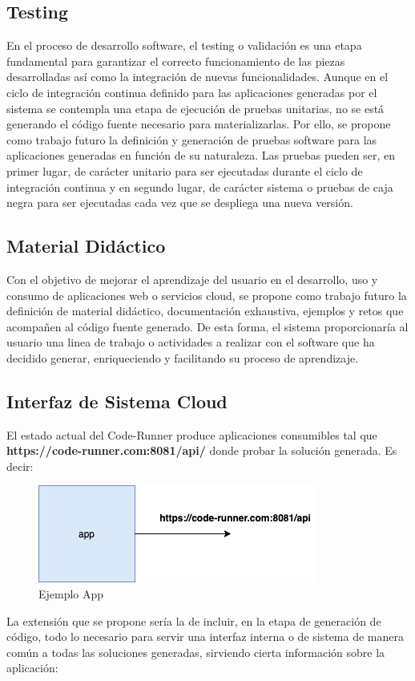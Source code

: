 \documentclass[a4paper,11pt]{book}
\begin{document}
\subsection{Testing}

 En el proceso de desarrollo software, el testing o validación es una etapa fundamental para garantizar el correcto funcionamiento de las piezas desarrolladas así como la integración de nuevas funcionalidades. Aunque en el ciclo de integración continua definido para las aplicaciones generadas por el sistema se contempla una etapa de ejecución de pruebas unitarias, no se está generando el código fuente necesario para materializarlas. Por ello, se propone como trabajo futuro la definición y generación de pruebas software para las aplicaciones generadas en función de su naturaleza. Las pruebas pueden ser, en primer lugar, de carácter unitario para ser ejecutadas durante el ciclo de integración continua y en segundo lugar, de carácter sistema o pruebas de caja negra para ser ejecutadas cada vez que se despliega una nueva versión. 

\subsection{Material Didáctico}

Con el objetivo de mejorar el aprendizaje del usuario en el desarrollo, uso y consumo de aplicaciones web o servicios cloud, se propone como trabajo futuro la definición de material didáctico, documentación exhaustiva, ejemplos y retos que acompañen al código fuente generado. De esta forma, el sistema proporcionaría al usuario una linea de trabajo o actividades a realizar con el software que ha decidido generar, enriqueciendo y facilitando su proceso de aprendizaje. 

\subsection{Interfaz de Sistema Cloud}


El estado actual del Code-Runner produce aplicaciones consumibles tal que  \textbf{ https://code-runner.com:8081/api/}  donde probar la solución generada. Es decir: 

   \begin{figure}[H]
\centering
\includegraphics[scale=0.5]{imagenes/api.png}
\caption{ Ejemplo App  }
\end{figure}
La extensión que se propone sería la de incluir, en la etapa de generación de código, todo lo necesario para servir una interfaz interna o de sistema de manera común a todas las soluciones generadas, sirviendo  cierta información sobre la aplicación:
\end{document}
